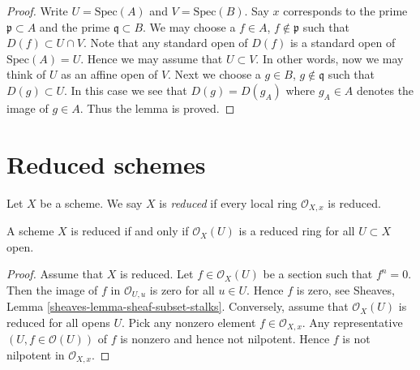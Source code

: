 \begin{proof}
Write $U = \text{Spec}(A)$ and $V = \text{Spec}(B)$.
Say $x$ corresponds to the prime $\mathfrak p \subset A$
and the prime $\mathfrak q \subset B$.
We may choose a $f \in A$, $f \not \in \mathfrak p$ such that
$D(f) \subset U \cap V$. Note that any standard open of $D(f)$
is a standard open of $\text{Spec}(A) = U$. Hence we may assume
that $U \subset V$. In other words, now we may think of $U$
as an affine open of $V$. Next we choose a
$g \in B$, $g \not \in \mathfrak q$ such that
$D(g) \subset U$. In this case we see that $D(g) = D(g_A)$
where $g_A \in A$ denotes the image of $g \in A$. Thus the lemma
is proved.
\end{proof}






















\section{Reduced schemes}
\label{section-reduced}

\begin{definition}
\label{definition-reduced}
Let $X$ be a scheme. We say $X$ is {\it reduced} if every local ring
$\mathcal{O}_{X, x}$ is reduced.
\end{definition}

\begin{lemma}
\label{lemma-reduced}
A scheme $X$ is reduced if and only if $\mathcal{O}_X(U)$
is a reduced ring for all $U \subset X$ open.
\end{lemma}

\begin{proof}
Assume that $X$ is reduced.
Let $f \in \mathcal{O}_X(U)$ be a section such that $f^n = 0$.
Then the image of $f$ in $\mathcal{O}_{U, u}$ is zero for
all $u \in U$. Hence $f$ is zero, see
Sheaves, Lemma \ref{sheaves-lemma-sheaf-subset-stalks}.
Conversely, assume that $\mathcal{O}_X(U)$ is reduced
for all opens $U$. Pick any nonzero element $f \in \mathcal{O}_{X, x}$.
Any representative $(U, f \in \mathcal{O}(U))$  of $f$ is nonzero and
hence not nilpotent. Hence $f$ is not nilpotent in $\mathcal{O}_{X, x}$.
\end{proof}

